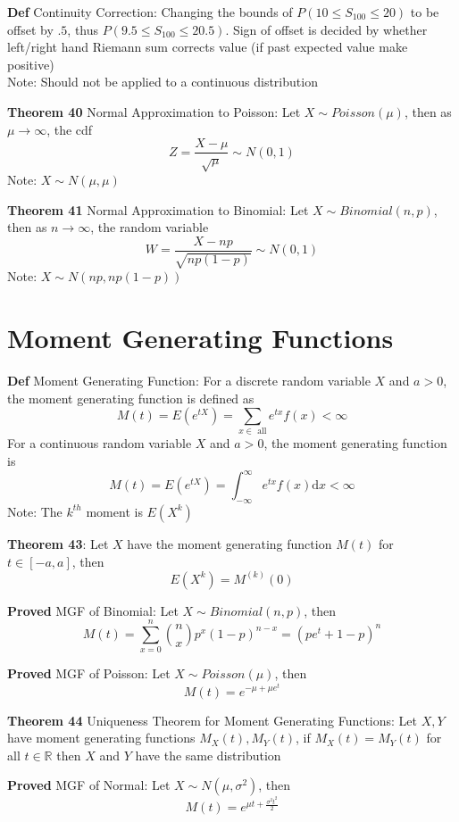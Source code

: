 \documentclass[11pt,notitlepage]{report}
\begin{document}
\textbf{Def} Continuity Correction: Changing the bounds of $P(10 \leq S_{100} \leq 20)$ to be offset by $.5$, thus $P(9.5 \leq S_{100} \leq 20.5)$. Sign of offset is decided by whether left/right hand Riemann sum corrects value (if past expected value make positive)\\
\hspace*{5mm} Note: Should not be applied to a continuous distribution

\textbf{Theorem 40} Normal Approximation to Poisson: Let $X \sim Poisson(\mu)$, then as $\mu \to \infty$, the cdf
$$Z = \frac{X - \mu}{\sqrt{\mu}} \sim N(0, 1)$$
\hspace*{5mm} Note: $X \sim N(\mu, \mu)$

\textbf{Theorem 41} Normal Approximation to Binomial: Let $X \sim Binomial(n, p)$, then as $n \to \infty$, the random variable
$$W = \frac{X-np}{\sqrt{np(1-p)}} \sim N(0, 1)$$
\hspace*{5mm} Note: $X \sim N(np, np(1-p))$



\section{Moment Generating Functions}

\textbf{Def} Moment Generating Function: For a discrete random variable $X$ and $a > 0$, the moment generating function is defined as
$$M(t) = E(e^{tX}) = \sum_{x \in \text{ all}} e^{tx} f(x) < \infty$$
For a continuous random variable $X$ and $a > 0$, the moment generating function is
$$M(t) = E(e^{tX}) = \int_{-\infty}^\infty e^{tx} f(x) \mathrm{d}x < \infty$$
\hspace*{5mm} Note: The $k^{th}$ moment is $E(X^k)$

\textbf{Theorem 43}: Let $X$ have the moment generating function $M(t)$ for $t \in [-a, a]$, then
$$E(X^k) = M^{(k)}(0)$$

\textbf{Proved} MGF of Binomial: Let $X \sim Binomial(n, p)$, then
$$M(t) = \sum^n_{x=0} \binom{n}{x}p^x(1-p)^{n-x} = (pe^t + 1 -p)^n$$

\textbf{Proved} MGF of Poisson: Let $X \sim Poisson(\mu)$, then
$$M(t) = e^{-\mu + \mu e^t}$$

\textbf{Theorem 44} Uniqueness Theorem for Moment Generating Functions: Let $X, Y$ have moment generating functions $M_X(t), M_Y(t)$, if $M_X(t) = M_Y(t)$ for all $t \in \mathbb R$ then $X$ and $Y$ have the same distribution

\textbf{Proved} MGF of Normal: Let $X \sim N(\mu, \sigma^2)$, then
$$M(t) = e^{\mu t + \frac{\sigma^2t^2}{2}}$$
\end{document}
